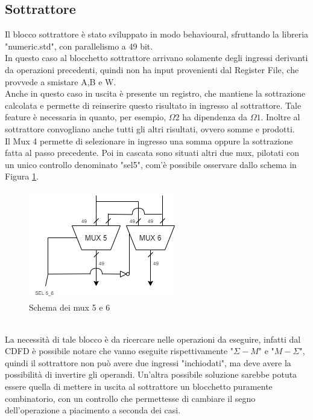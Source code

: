 \documentclass[a4paper, titlepage]{article}
\begin{document}
\subsection{Sottrattore}%
Il blocco sottrattore è stato sviluppato in modo behavioural, sfruttando la libreria "numeric.std", con parallelismo a 49 bit.\\
In questo caso al blocchetto sottrattore arrivano solamente degli ingressi derivanti da operazioni precedenti, quindi non ha input provenienti dal Register File, che provvede a smistare A,B e W. \\Anche in questo caso in uscita è presente un registro, che mantiene la sottrazione calcolata e permette di reinserire questo risultato in ingresso al sottrattore. Tale feature è necessaria in quanto, per esempio, $\Omega 2$ ha dipendenza da $\Omega 1$. Inoltre al sottrattore convogliano anche tutti gli altri risultati, ovvero somme e prodotti.\\Il Mux 4 permette di selezionare in ingresso una somma oppure la sottrazione fatta al passo precedente. Poi in cascata sono situati altri due mux, pilotati con un unico controllo denominato "sel5", com'è possibile osservare dallo schema in Figura \ref{fig:mux5_6}.
\begin{figure}[h]
    \centering
    \includegraphics[scale=0.5]{mux5_6.png}
    \caption{Schema dei mux 5 e 6}
    \label{fig:mux5_6}
\end{figure}\\
La necessità di tale blocco è da ricercare nelle operazioni da eseguire, infatti dal CDFD è possibile notare che vanno eseguite rispettivamente "$\Sigma - M$" e "$M-\Sigma$", quindi il sottrattore non può avere due ingressi "inchiodati", ma deve avere la possibilità di invertire gli operandi. Un'altra possibile soluzione sarebbe potuta essere quella di mettere in uscita al sottrattore un blocchetto puramente combinatorio, con un controllo che permettesse di cambiare il segno dell'operazione a piacimento a seconda dei casi.\\
\end{document}

